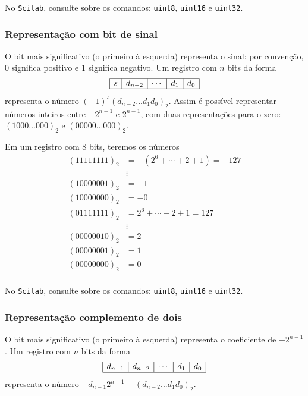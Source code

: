 \documentclass[main.tex]{subfiles}
\begin{document}
\ifisscilab
\begin{obs}
  No \verb+Scilab+, consulte sobre os comandos: \verb+uint8+, \verb+uint16+ e \verb+uint32+.
\end{obs}
\fi

\subsubsection{Representação com bit de sinal}
O bit mais significativo (o primeiro à esquerda) representa o sinal: por convenção, $0$ significa positivo e $1$ significa negativo. Um registro com $n$ bits da forma
\begin{equation*}
  \begin{array}{|c|c|c|c|c|} \hline
    s & d_{n-2} & \cdots & d_1 & d_0 \\\hline
  \end{array}  
\end{equation*}
representa o número $(-1)^s(d_{n-2}...d_1d_0)_2$. Assim é possível representar números inteiros entre $-2^{n-1}$ e $2^{n-1}$, com duas representações para o zero: $(1000...000)_2$ e $(00000...000)_2$.
\begin{ex}
Em um registro com $8$ bits, teremos os números
\begin{equation*}
\begin{array}{cl}
 (11111111)_2 &= -(2^{6}+\cdots+2+1)=-127\\
     &\vdots    \\
 (10000001)_2 &= -1 \\
 (10000000)_2 &= -0 \\
 (01111111)_2 &= 2^6+\cdots+2+1=127 \\
     &\vdots    \\
 (00000010)_2 &= 2 \\
 (00000001)_2 &= 1 \\
 (00000000)_2 &= 0 \\
\end{array}  
\end{equation*}
\end{ex}

\ifisscilab
\begin{obs}
  No \verb+Scilab+, consulte sobre os comandos: \verb+uint8+, \verb+uint16+ e \verb+uint32+.
\end{obs}
\fi

\subsubsection{Representação complemento de dois}
O bit mais significativo (o primeiro à esquerda) representa o coeficiente de $-2^{n-1}$.  Um registro com $n$ bits da forma
\begin{equation*}
  \begin{array}{|c|c|c|c|c|} \hline
    d_{n-1}&d_{n-2}&\cdots&d_1&d_0\\\hline
  \end{array}  
\end{equation*}
representa o número $-d_{n-1}2^{n-1}+(d_{n-2}...d_1d_0)_2$. 
\end{document}
